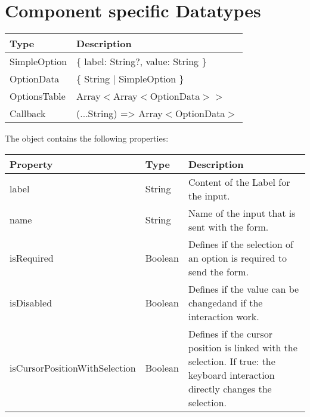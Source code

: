 \section*{Component specific Datatypes}

\begin{table}[!htb] 
    \label{api:selectComponentTypes}
    \footnotesize
    \setlength\extrarowheight{4pt}
    \begin{tabular}{ p{5cm} p{7.5cm}}
        \toprule[1.2pt]
        \textbf{Type}    & \textbf{Description} \\
        \midrule    
        SimpleOption & \{ label: String?, value: String \}    \\
        OptionData   & \{ String | SimpleOption \}            \\
        OptionsTable & Array$<$Array$<$OptionData$>>$         \\
        Callback     & (...String) => Array$<$OptionData$>$   \\
        \bottomrule[1.2pt]
    \end{tabular}
\end{table}

\vspace*{12pt}
The  object contains the following properties: 

\begin{table}[!htb] 
    \label{api:selectComponentSelectAttributes}
    \footnotesize
    \setlength\extrarowheight{4pt}
    \begin{tabular}{ p{4cm} p{2.5cm} p{6cm} }
        \toprule[1.2pt]
        \textbf{Property}             & \textbf{Type} & \textbf{Description} \\
        \midrule
        label                         & String        & Content of the Label for the input. \\
        name                          & String        & Name of the input that is sent with the form. \\
        isRequired                    & Boolean       & Defines if the selection of an option is required to send the form. \\
        isDisabled                    & Boolean       & Defines if the value can be changedand if the interaction work. \\
        isCursorPositionWithSelection & Boolean       & Defines if the cursor position is linked with the selection. 
                                                        If true: the keyboard interaction directly changes the selection. \\
        \bottomrule[1.2pt]
    \end{tabular}
\end{table}


